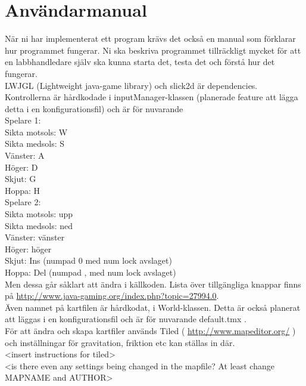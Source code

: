 \section{Användarmanual}
{\color{red}När ni har implementerat ett program krävs det också en manual som förklarar hur programmet fungerar. Ni ska beskriva programmet tillräckligt mycket för att en labbhandledare själv ska kunna starta det, testa det och förstå hur det fungerar. \\}
\vspace{11pt}
LWJGL (Lightweight java-game library) och slick2d är dependencies.\\
Kontrollerna är hårdkodade i inputManager-klassen (planerade feature att lägga detta i en konfigurationsfil) och är för nuvarande\\
Spelare 1:\\
Sikta motsols: W\\
Sikta medsols: S\\
Vänster: A\\
Höger: D\\
Skjut: G\\
Hoppa: H\\
\vspace{11pt}
Spelare 2:\\
Sikta motsols: upp\\
Sikta medsols: ned\\
Vänster: vänster\\
Höger: höger\\
Skjut: Ins (numpad 0 med num lock avslaget)\\
Hoppa: Del (numpad , med num lock avslaget)\\
\vspace{11pt}
Men dessa går såklart att ändra i källkoden. Lista över tillgängliga knappar finns på \url{http://www.java-gaming.org/index.php?topic=27994.0}.\\
\vspace{11pt}
\vspace{11pt}
Även namnet på kartfilen är hårdkodat, i World-klassen. Detta är också planerat att läggas i en konfigurationsfil och är för nuvarande default.tmx .\\
För att ändra och skapa kartfiler används Tiled ( \url{http://www.mapeditor.org/} ) och inställningar för gravitation, friktion etc kan ställas in där.\\
\vspace{11pt}
{\color{red}<insert instructions for tiled>\\
<is there even any settings being changed in the mapfile? At least change MAPNAME and AUTHOR>\\}
